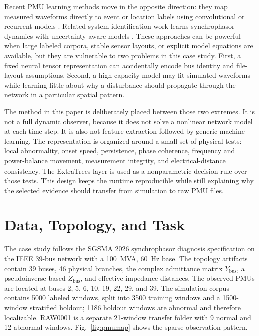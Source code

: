\documentclass[conference]{IEEEtran}
\begin{document}
Recent PMU learning methods move in the opposite direction: they map measured waveforms directly to event or location labels using convolutional or recurrent models \cite{li2018,zhu2018}. Related system-identification work learns synchrophasor dynamics with uncertainty-aware models \cite{jalali2021}. These approaches can be powerful when large labeled corpora, stable sensor layouts, or explicit model equations are available, but they are vulnerable to two problems in this case study. First, a fixed neural tensor representation can accidentally encode bus identity and file-layout assumptions. Second, a high-capacity model may fit simulated waveforms while learning little about why a disturbance should propagate through the network in a particular spatial pattern.

The method in this paper is deliberately placed between those two extremes. It is not a full dynamic observer, because it does not solve a nonlinear network model at each time step. It is also not feature extraction followed by generic machine learning. The representation is organized around a small set of physical tests: local abnormality, onset speed, persistence, phase coherence, frequency and power-balance movement, measurement integrity, and electrical-distance consistency. The ExtraTrees layer is used as a nonparametric decision rule over those tests. This design keeps the runtime reproducible while still explaining why the selected evidence should transfer from simulation to raw PMU files.

\section{Data, Topology, and Task}
\label{sec:data}
The case study follows the SGSMA 2026 synchrophasor diagnosis specification \cite{sgsma2026} on the IEEE 39-bus network with a 100~MVA, 60~Hz base. The topology artifacts contain 39 buses, 46 physical branches, the complex admittance matrix $Y_{\mathrm{bus}}$, a pseudoinverse-based $Z_{\mathrm{bus}}$, and effective impedance distances. The observed PMUs are located at buses 2, 5, 6, 10, 19, 22, 29, and 39. The simulation corpus contains 5000 labeled windows, split into 3500 training windows and a 1500-window stratified holdout; 1186 holdout windows are abnormal and therefore localizable. RAW0001 is a separate 21-window transfer folder with 9 normal and 12 abnormal windows. Fig.~\ref{fig:pmumap} shows the sparse observation pattern.
\end{document}
